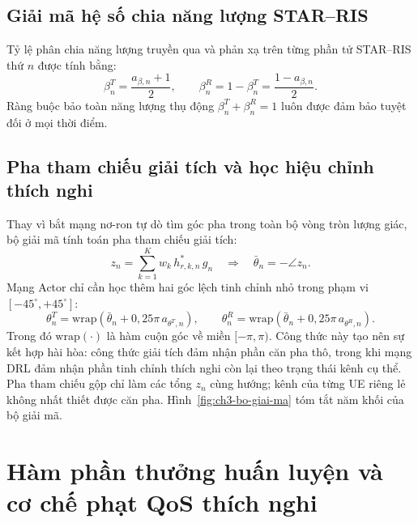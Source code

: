\subsection{Giải mã hệ số chia năng lượng STAR--RIS}
\label{ssec:giai-ma-beta}

Tỷ lệ phân chia năng lượng truyền qua và phản xạ trên từng phần tử STAR--RIS thứ $n$ được tính bằng:
\begin{equation}
\beta^T_n = \frac{a_{\beta,n} + 1}{2}, \qquad \beta^R_n = 1 - \beta^T_n = \frac{1 - a_{\beta,n}}{2}.
\label{eq:beta}
\end{equation}
Ràng buộc bảo toàn năng lượng thụ động $\beta^T_n + \beta^R_n = 1$ luôn được đảm bảo tuyệt đối ở mọi thời điểm.

\subsection{Pha tham chiếu giải tích và học hiệu chỉnh thích nghi}
\label{ssec:giai-ma-pha}

Thay vì bắt mạng nơ-ron tự dò tìm góc pha trong toàn bộ vòng tròn lượng giác, bộ giải mã tính toán pha tham chiếu
giải tích:
\begin{equation}
z_n = \sum_{k=1}^{K} w_k\, h^{*}_{r,k,n}\, g_n \quad \Longrightarrow \quad \bar{\theta}_n = -\angle z_n .
\label{eq:theta-ref}
\end{equation}
Mạng Actor chỉ cần học thêm hai góc lệch tinh chỉnh nhỏ trong phạm vi $[-45^\circ, +45^\circ]$:
\begin{equation}
\theta^T_n = \mathrm{wrap}\!\left(\bar{\theta}_n + 0,25\pi\, a_{\theta^T\!,n}\right), \qquad
\theta^R_n = \mathrm{wrap}\!\left(\bar{\theta}_n + 0,25\pi\, a_{\theta^R\!,n}\right).
\label{eq:theta-TR}
\end{equation}
Trong đó $\mathrm{wrap}(\cdot)$ là hàm cuộn góc về miền $[-\pi, \pi)$. Công thức này tạo nên sự kết hợp hài hòa:
công thức giải tích đảm nhận phần căn pha thô, trong khi mạng DRL đảm nhận phần tinh chỉnh thích nghi còn lại
theo trạng thái kênh cụ thể. Pha tham chiếu gộp chỉ làm các tổng $z_n$ cùng hướng; kênh của từng UE riêng lẻ không
nhất thiết được căn pha. Hình~\ref{fig:ch3-bo-giai-ma} tóm tắt năm khối của bộ giải mã.



\section{Hàm phần thưởng huấn luyện và cơ chế phạt QoS thích nghi}
\label{ssec:phan-thuong-huan-luyen}

